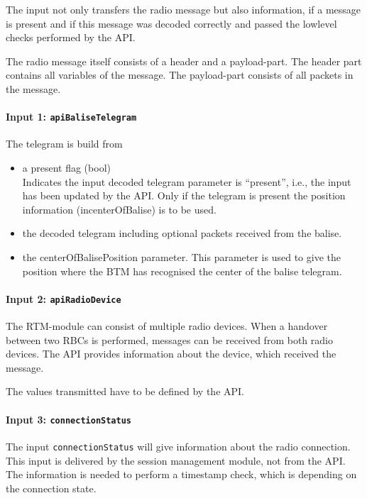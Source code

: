 \documentclass{template/openetcs_report}
\begin{document}
The input not only transfers the radio message but also information, if a message is present and if this message was decoded correctly and passed the lowlevel checks performed by the API.

The radio message itself consists of a header and a payload-part. The header part contains all variables of the message. The payload-part consists of all packets in the message.

\paragraph{Input 1: \texttt{apiBaliseTelegram}}

The telegram is build from 
\begin{itemize}
\item a present flag (bool)\\
Indicates the input decoded telegram parameter is “present”, i.e., the input has been updated by the API.
Only if the telegram is present the position information (incenterOfBalise) is to be used.\\
\item the decoded telegram including optional packets received from the balise.
\item the centerOfBalisePosition parameter. This parameter is used to give the position where the BTM has recognised the center of the balise telegram.
\end{itemize}

\paragraph{Input 2: \texttt{apiRadioDevice}}
The RTM-module can consist of multiple radio devices. When a handover between two RBCs is performed, messages can be received from both radio devices. The API provides information about the device, which received the message.

The values transmitted have to be defined by the API.

\paragraph{Input 3: \texttt{connectionStatus}}
The input \texttt{connectionStatus} will give information about the radio connection. This input is delivered by the session management module, not from the API. The information is needed to perform a timestamp check, which is depending on the connection state.
\end{document}
